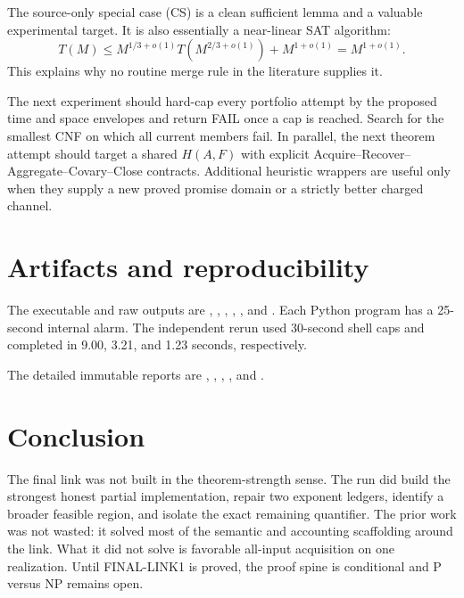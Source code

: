 \documentclass[11pt]{article}
\begin{document}
The source-only special case (CS) is a clean sufficient lemma and a valuable
experimental target.  It is also essentially a near-linear SAT algorithm:
\[
 T(M)\le M^{1/3+o(1)}T(M^{2/3+o(1)})+M^{1+o(1)}
      =M^{1+o(1)}.
\]
This explains why no routine merge rule in the literature supplies it.

The next experiment should hard-cap every portfolio attempt by the proposed
time and space envelopes and return FAIL once a cap is reached.  Search for
the smallest CNF on which all current members fail.  In parallel, the next
theorem attempt should target a shared $H(A,F)$ with explicit
Acquire--Recover--Aggregate--Covary--Close contracts.  Additional heuristic
wrappers are useful only when they supply a new proved promise domain or a
strictly better charged channel.

\section{Artifacts and reproducibility}

The executable and raw outputs are
,
,
,
,
, and
.  Each Python program has a
25-second internal alarm.  The independent rerun used 30-second shell caps
and completed in 9.00, 3.21, and 1.23 seconds, respectively.

The detailed immutable reports are
,
,
,
, and
.

\section{Conclusion}

The final link was not built in the theorem-strength sense.  The run did
build the strongest honest partial implementation, repair two exponent
ledgers, identify a broader feasible region, and isolate the exact remaining
quantifier.  The prior work was not wasted: it solved most of the semantic and
accounting scaffolding around the link.  What it did not solve is favorable
all-input acquisition on one realization.  Until FINAL-LINK1 is proved, the
proof spine is conditional and P versus NP remains open.




\end{document}

